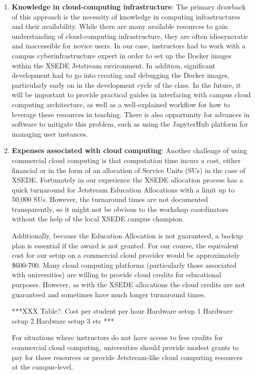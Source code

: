 \begin{enumerate}

\item {\bf Knowledge in cloud-computing infrastructure}: The primary drawback of
this approach is the necessity of knowledge in computing infrastructures and
their availability. While there are many available resources to gain
understanding of cloud-computing infrastructure, they are often idiosyncratic and
inaccessible for novice users. In our case, instructors had to work with a
campus cyberinfrastructure expert in order to set up the Docker images within
the XSEDE Jetstream environment. In addition, significant development had to go
into creating and debugging the Docker images, particularly early on in the
development cycle of the class. In the future, it will be important to provide
practical guides in interfacing with campus cloud computing architecture, as
well as a well-explained workflow for how to leverage these resources in
teaching. There is also opportunity for advances in software to mitigate this
problem, such as using the JupyterHub \cite{perez2015project} platform
for managing user instances.

\item {\bf Expenses associated with cloud computing}: Another challenge of using
commercial cloud computing is that computation time incurs a cost, either
financial or in the form of an allocation of Service Units (SUs) in the case of
XSEDE. Fortunately in our experience the XSEDE allocation process has a quick
turnaround for Jetstream Education Allocations with a limit up to 50,000 SUs.
However, the turnaround times are not documented transparently, so it might not
be obvious to the workshop coordinators without the help of the local XSEDE campus
champion.

Additionally, because the Education Allocation is not guaranteed, a backup plan
is essential if the award is not granted. For our course, the equivalent cost
for our setup on a commercial cloud provider would be approximately \$600-700.
Many cloud computing platforms (particularly those associated with universities)
are willing to provide cloud credits for educational purposes. However, as with
the XSEDE allocations the cloud credits are not guaranteed and sometimes have
much longer turnaround times.

***XXX
Table?:
                    Cost per student per hour
Hardware setup 1
Hardware setup 2
Hardware setup 3
etc
***

For situations where instructors do not have access to free credits for
commercial cloud computing, universities should provide modest grants to pay for
these resources or provide Jetstream-like cloud computing resources at the
campus-level.


\end{enumerate}
